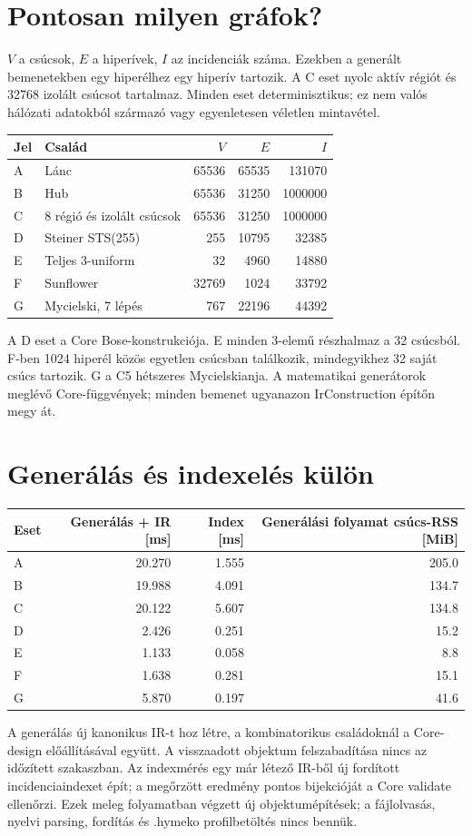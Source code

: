 \documentclass[10pt,a4paper]{article}
\begin{document}
\newpage\section*{Pontosan milyen gráfok?}
$V$ a csúcsok, $E$ a hiperívek, $I$ az incidenciák száma. Ezekben a generált
bemenetekben egy hiperélhez egy hiperív tartozik. A C eset nyolc aktív régiót és
32768 izolált csúcsot tartalmaz. Minden eset determinisztikus; ez nem valós hálózati
adatokból származó vagy egyenletesen véletlen mintavétel.
\begin{center}\begin{tabular}{llrrr}\toprule
Jel & Család & $V$ & $E$ & $I$\\\midrule
A & Lánc & 65536 & 65535 & 131070 \\
B & Hub & 65536 & 31250 & 1000000 \\
C & 8 régió és izolált csúcsok & 65536 & 31250 & 1000000 \\
D & Steiner STS(255) & 255 & 10795 & 32385 \\
E & Teljes 3-uniform & 32 & 4960 & 14880 \\
F & Sunflower & 32769 & 1024 & 33792 \\
G & Mycielski, 7 lépés & 767 & 22196 & 44392 \\
\bottomrule\end{tabular}\end{center}
A D eset a Core Bose-konstrukciója. E minden 3-elemű részhalmaz a 32 csúcsból.
F-ben 1024 hiperél közös egyetlen csúcsban találkozik, mindegyikhez 32 saját
csúcs tartozik. G a C5 hétszeres Mycielskianja. A matematikai generátorok meglévő
Core-függvények; minden bemenet ugyanazon IrConstruction építőn megy át.

\section*{Generálás és indexelés külön}
\begin{center}\begin{tabular}{lrrr}\toprule
Eset & Generálás + IR [ms] & Index [ms] & Generálási folyamat csúcs-RSS [MiB]\\\midrule
A & 20.270 & 1.555 & 205.0 \\
B & 19.988 & 4.091 & 134.7 \\
C & 20.122 & 5.607 & 134.8 \\
D & 2.426 & 0.251 & 15.2 \\
E & 1.133 & 0.058 & 8.8 \\
F & 1.638 & 0.281 & 15.1 \\
G & 5.870 & 0.197 & 41.6 \\
\bottomrule\end{tabular}\end{center}
A generálás új kanonikus IR-t hoz létre, a kombinatorikus családoknál a Core-design
előállításával együtt. A visszaadott objektum felszabadítása nincs az időzített
szakaszban. Az indexmérés egy már létező IR-ből új fordított incidenciaindexet
épít; a megőrzött eredmény pontos bijekcióját a Core validate ellenőrzi.
Ezek meleg folyamatban végzett új objektumépítések; a fájlolvasás, nyelvi parsing,
fordítás és .hymeko profilbetöltés nincs bennük.
\end{document}
